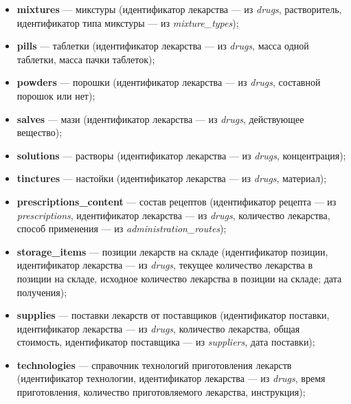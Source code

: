 \documentclass[a4paper]{article}
\newcommand{\dbtable}[1]{\textbf{#1}}
\newcommand{\dbtableref}[1]{\textit{#1}}
\begin{document}
\begin{itemize}
				\item \dbtable{mixtures} --- микстуры (идентификатор лекарства --- из \dbtableref{drugs}, растворитель, идентификатор типа микстуры --- из \dbtableref{mixture\_types});
				
				\item \dbtable{pills} --- таблетки (идентификатор лекарства --- из \dbtableref{drugs}, масса одной таблетки, масса пачки таблеток);
				
				\item \dbtable{powders} --- порошки (идентификатор лекарства --- из \dbtableref{drugs}, составной порошок или нет);
				
				\item \dbtable{salves} --- мази (идентификатор лекарства --- из \dbtableref{drugs}, действующее вещество);
				
				\item \dbtable{solutions} --- растворы (идентификатор лекарства --- из \dbtableref{drugs}, концентрация);
				
				\item \dbtable{tinctures} --- настойки (идентификатор лекарства --- из \dbtableref{drugs}, материал);
				
				\item \dbtable{prescriptions\_content} --- состав рецептов (идентификатор рецепта --- из \dbtableref{prescriptions}, идентификатор лекарства --- из \dbtableref{drugs}, количество лекарства, способ применения --- из \dbtableref{administration\_routes});
				
				\item \dbtable{storage\_items} --- позиции лекарств на складе (идентификатор позиции, идентификатор лекарства --- из \dbtableref{drugs}, текущее количество лекарства в позиции на складе, исходное количество лекарства в позиции на складе; дата получения);
				
				\item \dbtable{supplies} --- поставки лекарств от поставщиков (идентификатор поставки, идентификатор лекарства --- из \dbtableref{drugs}, количество лекарства, общая стоимость, идентификатор поставщика --- из \dbtableref{suppliers}, дата поставки);
				
				\item \dbtable{technologies} --- справочник технологий приготовления лекарств (идентификатор технологии, идентификатор лекарства --- из \dbtableref{drugs}, время приготовления, количество приготовляемого лекарства, инструкция);
				

\end{itemize}
\end{document}
